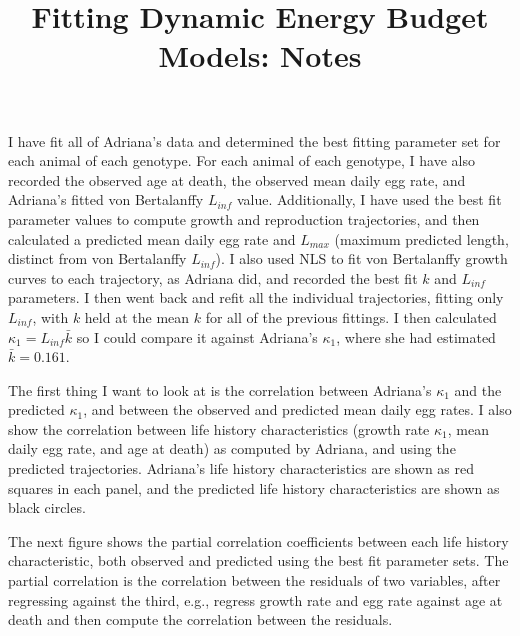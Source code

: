 \documentclass[12pt,reqno,final]{amsart}
\title[DEB fitting notes]{Fitting Dynamic Energy Budget Models: Notes}
\theoremstyle{plain}
\numberwithin{equation}{part}
\begin{document}
\maketitle

I have fit all of Adriana's data and determined the best fitting
parameter set for each animal of each genotype. For each animal of
each genotype, I have also recorded the observed age at death, the
observed mean daily egg rate, and Adriana's fitted von Bertalanffy
$L_{inf}$ value. Additionally, I have used the best fit parameter
values to compute growth and reproduction trajectories, and then
calculated a predicted mean daily egg rate and $L_{max}$ (maximum
predicted length, distinct from von Bertalanffy $L_{inf}$). I also
used NLS to fit von Bertalanffy growth curves to each trajectory, as
Adriana did, and recorded the best fit $k$ and $L_{inf}$ parameters. I
then went back and refit all the individual trajectories, fitting only
$L_{inf}$, with $k$ held at the mean $k$ for all of the previous
fittings. I then calculated $\kappa_1 = L_{inf}\bar{k}$ so I
could compare it against Adriana's $\kappa_1$, where she had estimated
$\bar{k} = 0.161$.

The first thing I want to look at is the correlation between Adriana's
$\kappa_1$ and the predicted $\kappa_1$, and between the observed and
predicted mean daily egg rates. I also show the correlation between
life history characteristics (growth rate $\kappa_1$, mean daily egg
rate, and age at death) as computed by Adriana, and using the
predicted trajectories. Adriana's life history characteristics are shown as red
squares in each panel, and the predicted life history characteristics
are shown as black circles.

The next figure shows the partial correlation coefficients between
each life history characteristic, both observed and predicted using
the best fit parameter sets. The partial correlation is the
correlation between the residuals of two variables, after regressing
against the third, e.g., regress growth rate and egg rate against age
at death and then compute the correlation between the
residuals.
\end{document}
